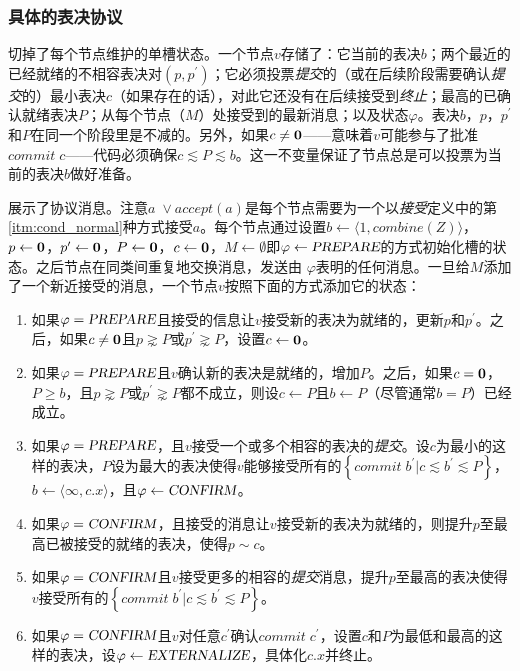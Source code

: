 \subsubsection{具体的表决协议}\label{sec:scp_nominate_concrete}

切掉了每个节点维护的单槽状态。一个节点$v$存储了：它当前的表决$b$；两个最近的已经就绪的不相容表决对$(p,p^{\prime})$；它必须投票\textit{提交}的（或在后续阶段需要确认\textit{提交}的）最小表决$c$（如果存在的话），对此它还没有在后续接受到\textit{终止}；最高的已确认就绪表决$P$；从每个节点（$M$）处接受到的最新消息；以及状态$\varphi$。表决$b$，$p$，$p^{\prime}$和$P$在同一个阶段里是不减的。另外，如果$c\neq{\bm 0}$——意味着$v$可能参与了批准$commit\;c$——代码必须确保$c\lesssim P\lesssim b$。这一不变量保证了节点总是可以投票为当前的表决$b$做好准备。

展示了协议消息。注意$a\;\vee accept(a)$是每个节点需要为一个{\quorum}以\textit{接受}定义中的第\ref{itm:cond_normal}种方式接受$a$。每个节点通过设置$b\leftarrow \langle 1,combine(Z)\rangle$，$p\leftarrow {\bm 0}$，$p^{\prime}\leftarrow {\bm 0}$，$P\leftarrow {\bm 0}$，$c\leftarrow {\bm 0}$，$M\leftarrow\emptyset$即$\varphi \leftarrow \textsl{PREPARE}$的方式初始化槽的状态。之后节点在同类间重复地交换消息，发送由 $\varphi$表明的任何消息。一旦给$M$添加了一个新近接受的消息，一个节点$v$按照下面的方式添加它的状态：

\begin{enumerate}\label{protocal_case}
	\item 如果$\varphi = \textsl{PREPARE}$且接受的信息让$v$接受新的表决为就绪的，更新$p$和$p^{\prime}$。之后，如果$c\neq {\bm 0}$且$p\gnsim P$或$p^{\prime}\gnsim P$，设置$c\leftarrow {\bm 0}$。
	\item 如果$\varphi = \textsl{PREPARE}$且$v$确认新的表决是就绪的，增加$P$。之后，如果$c={\bm 0}$，$P\geq b$，且$p\gnsim P$或$p^{\prime}\gnsim P$都不成立，则设$c\leftarrow P$且$b\leftarrow P$（尽管通常$b=P$）已经成立。
	\item 如果$\varphi = \textsl{PREPARE}$，且$v$接受一个或多个相容的表决的\textit{提交}。设$c$为最小的这样的表决，$P$设为最大的表决使得$v$能够接受所有的$\left\{commit\;b^{\prime}|c\lesssim b^{\prime}\lesssim P\right\}$，$b\leftarrow \langle \infty, c.x\rangle$，且$\varphi\leftarrow \textsl{CONFIRM}$。
	\item 如果$\varphi = \textsl{CONFIRM}$，且接受的消息让$v$接受新的表决为就绪的，则提升$p$至最高已被接受的就绪的表决，使得$p\sim c$。
	\item 如果$\varphi = \textsl{CONFIRM}$且$v$接受更多的相容的\textit{提交}消息，提升$p$至最高的表决使得$v$接受所有的$\left\{commit\;b^{\prime}|c\lesssim b^{\prime} \lesssim P\right\}$。
	\item 如果$\varphi = \textsl{CONFIRM}$且$v$对任意$c^{\prime}$确认$commit\;c^{\prime}$，设置$c$和$P$为最低和最高的这样的表决，设$\varphi\leftarrow\textsl{EXTERNALIZE}$，具体化$c.x$并终止。
\end{enumerate}

